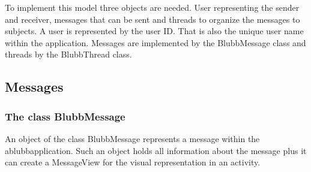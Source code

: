 \documentclass[12pt,a4paper,oneside]{report}
\newcommand{\appname}{ablubb}
\begin{document}
To implement this model three objects are needed. User representing the sender and receiver, messages that can be sent and threads to organize the messages to subjects. A user is represented by the user ID. That is also the unique user name within the application. Messages are implemented by the BlubbMessage class and threads by the BlubbThread class.

\subsection{Messages}
\subsubsection{The class BlubbMessage}
An object of the class BlubbMessage represents a message within the \appname  application. Such an object holds all information about the message plus it can create a MessageView for the visual representation in an activity. 
\end{document}

